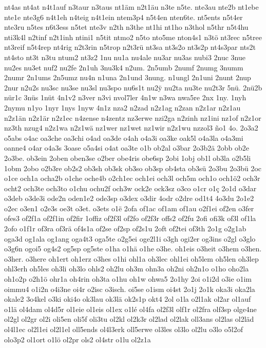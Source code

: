 {nt4as
nt4at
n4t1auf
n3taur
n3taus
nt1äm
n2t1äu
n3te
n5te.
nte3au
nte2b
nt1ebe
nte1e
nte3g6
n4t1eh
n4teig
n4t1ein
ntem3p4
n5t4en
nten6te.
nt5ents
n5t4er
nte3ru
n5tes
n6t3ess
n5tet
nte3v
n2th
n3the
nt1hi
nt1ho
n3thol
n5thr
n5t4hu
nti3k4l
n2tinf
n2t1inh
ntini1
n5tit
ntmo2
n5to
nto5me
nton4s1
n3tö
nt3rec
n5tree
nt3reif
n5t4rep
nt4rig
n2t3rin
n5trop
n2t3rü
nt3sa
nt3s2o
nt3s2p
nt4s3par
nts2t
nt4sto
nt3t
n3tu
ntum2
nt3z2
1nu
nu1a
nu4ale
nu3ar
nu3as
nubi3
2nuc
3nue
nu2es
nu3et
nuf2
nu2fe
2n1uh
3nu3k4
n2um.
2n5umb
2numf
2numg
3numm
2numr
2n1ums
2n5umz
nu4n
n1una
2n1und
3nung.
n1ungl
2n1uni
2nunt
2nup
2nur
n2u2s
nu3sc
nu3se
nu3sl
nu3spo
nu6s1t
nu2^^ff
nu2ta
nu3te
nu2t3r
5nü.
2nü2b
nür1c
3nüs
1nüt
4n1v2
n3ver
n3vi
nvol7ler
4n1w
n3wa
nwa5re
2nx
1ny.
1nyh
2nymu
n1yo
1nyr
1nys
1nyw
4n1z
nza2
n2zad
n2z1ag
n2zan
n2z1ar
n2z1au
n2z1än
n2z1är
n2z1ec
n4zense
n4zentz
nz3erwe
nzi2ga
n2zinh
nz1ini
nz1of
n2z1or
nz3th
nzug4
n2z1wa
n2z1wä
nz1wer
nz1wet
nz1wir
n2z1wu
nzzol3
ño1
4o.
2o3a2
o5abs
o4ac
oa3che
oa3chi
o4ad
oa3de
o4ah
o4a3i
oa3ke
oak5l
o4a3la
o4a3mi
oanne4
o4ar
o4a3s
3oase
o5a4si
o4at
oa3te
o1b
ob2al
o3bar
2o3b2ä
2obb
ob2e
2o3be.
ob3ein
2oben
oben3se
o2ber
obe4ris
obe6sp
2obi
1obj
ob1l
ob3la
o2b5li
1obm
2obo
o2b3re
ob2s2
ob3sh
ob3sk
ob3so
ob3sp
ob4sta
ob3sü
2o3bu
2o3bü
2oc
o1ce
och1a
ocha2b
o1che
oche4b
o2ch1ec
och1ei
och3l
och5m
och1o
och1ö2
och3r
ocht2
och3te
och3to
o1chu
ochu2f
och3w
ock2e
ock3sz
o3co
o1cr
o1ç
2o1d
o3dar
o3deb
o3de3i
ode2n
oden1e2
ode3sp
o3dex
o3dir
4odr
o2dre
od1t4
4o3du
2o1e2
o2ec
o3en1
o2e3s
oe3t
o3et.
o3ets
o1ë
2ofa
of1ac
of1am
of1au
o2f1ei
of2en
o3fer
ofes3
of2f1a
of2f1in
of2fir
1offiz
of2f3l
of2fo
of2f3r
offs2
of2fu
2ofi
ofi3k
of3l
of1la
2ofo
o1f1r
of3ra
of3rä
of4s1a
of2se
of2sp
of2s1u
2oft
of2tei
of3th
2o1g
o2g1ab
oga3d
og1ala
og1ang
oga4t3
oga5te
o2g5ei
oge2l1i
o3gh
ogi2er
og3ins
o2gl
o3glo
o3g6n
ogoi5
og4s2
og5sp
og5ste
o1ha
o1hä
o1he
o3he.
oh1eis
o3heit
o3hem
o3hen.
o3her.
o3here
oh1ert
oh1erz
o3hes
o1hi
ohl1a
oh3lec
ohl1ei
oh5lem
oh5len
oh3lep
ohl3erh
oh5les
oh3li
oh3lo
ohls2
oh2lu
oh3m
ohn3a
oh2ni
oh2n1o
o1ho
oho2la
oh1o2p
o2h1ö
ohr1a
oh4rin
oh3ta
o1hu
oh1w
ohwa5
2o1hy
2oi
o1i2d
o3ie
o1im
oimmu4
o1i2n
o4i3ne
oi4r
o2isc
o3isch.
oi5se
o1ism
oi4st
2o1j
2o1k
oka3i
oka2la
okale2
3o4kel
o3ki
oki4o
ok3lau
ok3lä
ok2s1p
okt4
2ol
o1la
o2l1ak
ol2ar
ol1auf
o1lä
ol4dam
ol4d5r
ol1eie
ol1eis
ol1ex
o1lé
ol4fa
ol2f3l
olf1r
ol2fra
olf3sp
olge4ne
ol2gl
ol2gr
ol2i
oli5en
oli5f
oli3tu
ol2kl
ol2k3r
ol2lad
ol2lak
oll3ans
ol2las
ol2läd
ol4l1ec
ol2l1ei
ol2l1el
oll5ends
ol4l3erk
oll5erwe
ol3les
ol3lo
ol2lu
o3lo
o5l2of
olo3p2
ol1ort
o1lö
ol2pr
ols2
ol4str
o1lu
ol2z1a
}
